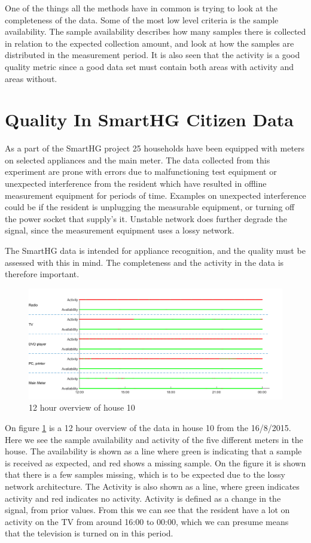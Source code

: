 One of the things all the methods have in common is trying to look at the completeness of the data. Some of the most low level criteria is the sample availability. The sample availability describes how many samples there is collected in relation to the expected collection amount, and look at how the samples are distributed in the measurement period. It is also seen that the activity is a good quality metric since a good data set must contain both areas with activity and areas without. 

\section{Quality In SmartHG Citizen Data}
As a part of the SmartHG project 25 households have been equipped with meters on selected appliances and the main meter. The data collected from this experiment are prone with errors due to malfunctioning test equipment or unexpected interference from the resident which have resulted in offline measurement equipment for periods of time. Examples on unexpected interference could be if the resident is unplugging the measurable equipment, or turning off the power socket that supply's it. Unstable network does further degrade the signal, since the measurement equipment uses a lossy network. 

The SmartHG data is intended for appliance recognition, and the quality must be assessed with this in mind. The completeness and the activity in the data is therefore important. 

\begin{figure}[H]
\centering
\includegraphics[width=1\textwidth]{billeder/Test.png}
\caption{12 hour overview of house 10}
\label{fig:12HRes}
\end{figure}

On figure \ref{fig:12HRes} is a 12 hour overview of the data in house 10 from the 16/8/2015. Here we see the sample availability and activity of the five different meters in the house. The availability is shown as a line where green is indicating that a sample is received as expected, and red shows a missing sample. On the figure it is shown that there is a few samples missing, which is to be expected due to the lossy network architecture. The Activity is also shown as a line, where green indicates activity and red indicates no activity. Activity is defined as a change in the signal, from prior values. From this we can see that the resident have a lot on activity on the TV from around 16:00 to 00:00, which we can presume means that the television is turned on in this period. 

